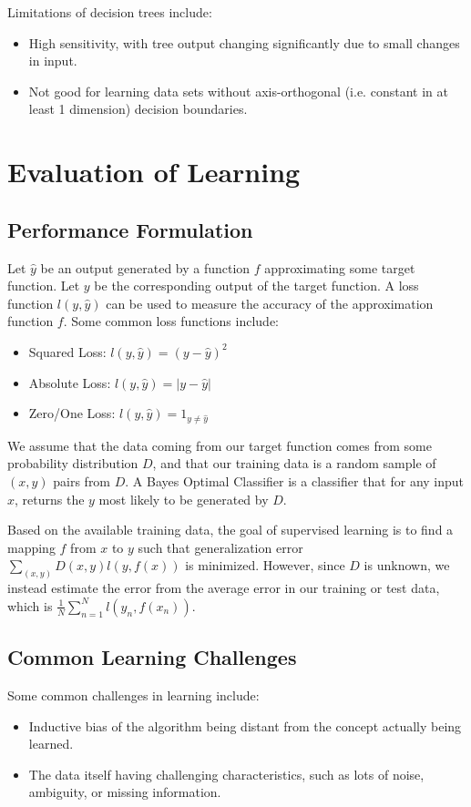 \documentclass[12pt,titlepage]{article}
\let\stdsection\section
\renewcommand\section{\clearpage\stdsection}
\begin{document}
      Limitations of decision trees include:
      \begin{itemize}
        \item High sensitivity, with tree output changing significantly due to small changes in input.
        \item Not good for learning data sets without axis-orthogonal (i.e. constant in at least 1 dimension) decision boundaries.
      \end{itemize}

  \section{Evaluation of Learning}

    \subsection{Performance Formulation}
      Let $\hat{y}$ be an output generated by a function $f$ approximating some target function. Let $y$ be the corresponding
      output of the target function. A loss function $l(y, \hat{y})$ can be used to measure the accuracy of the approximation
      function $f$. Some common loss functions include:
      \begin{itemize}
        \item Squared Loss: $l(y, \hat{y}) = (y - \hat{y})^2$
        \item Absolute Loss: $l(y, \hat{y}) = |y - \hat{y}|$
        \item Zero/One Loss: $l(y, \hat{y}) = 1_{y \neq \hat{y}}$
      \end{itemize}

      We assume that the data coming from our target function comes from some probability distribution $D$, and that our training data
      is a random sample of $(x, y)$ pairs from $D$. A Bayes Optimal Classifier is a classifier that for any input $x$, returns the
      $y$ most likely to be generated by $D$.

      Based on the available training data, the goal of supervised learning is to find a mapping $f$ from $x$ to $y$ such that
      generalization error $\sum_{(x,y)} D(x,y)l(y,f(x))$ is minimized. However, since $D$ is unknown, we instead estimate the error from
      the average error in our training or test data, which is $\frac{1}{N}\sum_{n=1}^N l(y_n, f(x_n))$.

    \subsection{Common Learning Challenges}
      Some common challenges in learning include:
      \begin{itemize}
        \item Inductive bias of the algorithm being distant from the concept actually being learned.
        \item The data itself having challenging characteristics, such as lots of noise, ambiguity, or missing information.
      \end{itemize}
\end{document}
